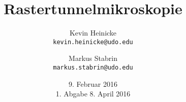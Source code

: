 


\title{%
    Rastertunnelmikroskopie
}
\author{%
    Kevin Heinicke\\
    \texttt{kevin.heinicke@udo.edu}
    \and
    Markus Stabrin\\
    \texttt{markus.stabrin@udo.edu}
}
\date{%
    9. Februar 2016\\
    {\small 1. Abgabe} 8. April 2016\\
}

    \maketitle%
    \tableofcontents
    \newpage
    
    

    \printbibliography

